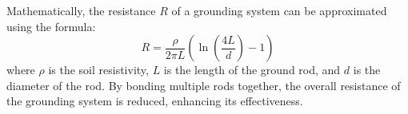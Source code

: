 Mathematically, the resistance \( R \) of a grounding system can be approximated using the formula:
\[
R = \frac{\rho}{2\pi L} \left( \ln\left(\frac{4L}{d}\right) - 1 \right)
\]
where \( \rho \) is the soil resistivity, \( L \) is the length of the ground rod, and \( d \) is the diameter of the rod. By bonding multiple rods together, the overall resistance of the grounding system is reduced, enhancing its effectiveness.


